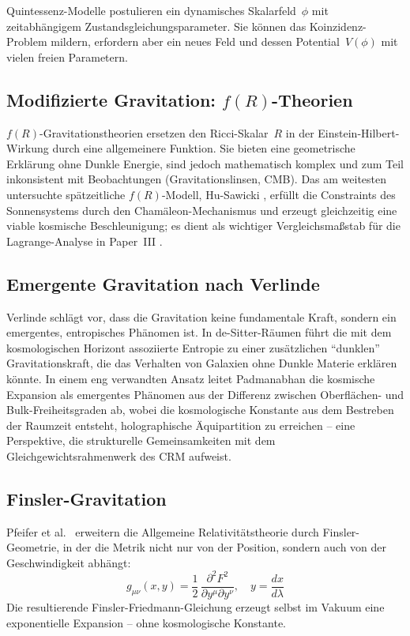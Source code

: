 \documentclass[aps,prd,twocolumn,superscriptaddress,nofootinbib]{revtex4-2}
\begin{document}
Quintessenz-Modelle \cite{Caldwell1998} postulieren ein dynamisches Skalarfeld~$\phi$ mit zeitabh\"angigem Zustandsgleichungsparameter. Sie k\"onnen das Koinzidenz-Problem mildern, erfordern aber ein neues Feld und dessen Potential~$V(\phi)$ mit vielen freien Parametern.

\subsection{Modifizierte Gravitation: $f(R)$-Theorien}

$f(R)$-Gravitationstheorien \cite{Starobinsky1980, Sotiriou2010} ersetzen den Ricci-Skalar~$R$ in der Einstein-Hilbert-Wirkung durch eine allgemeinere Funktion. Sie bieten eine geometrische Erkl\"arung ohne Dunkle Energie, sind jedoch mathematisch komplex und zum Teil inkonsistent mit Beobachtungen (Gravitationslinsen, CMB). Das am weitesten untersuchte sp\"atzeitliche $f(R)$-Modell, Hu-Sawicki \cite{HuSawicki2007}, erf\"ullt die Constraints des Sonnensystems durch den Cham\"aleon-Mechanismus und erzeugt gleichzeitig eine viable kosmische Beschleunigung; es dient als wichtiger Vergleichsma\ss{}stab f\"ur die Lagrange-Analyse in Paper~III \cite{Geiger2026c}.

\subsection{Emergente Gravitation nach Verlinde}

Verlinde \cite{Verlinde2011, Verlinde2017} schl\"agt vor, dass die Gravitation keine fundamentale Kraft, sondern ein emergentes, entropisches Ph\"anomen ist. In de-Sitter-R\"aumen f\"uhrt die mit dem kosmologischen Horizont assoziierte Entropie zu einer zus\"atzlichen ``dunklen'' Gravitationskraft, die das Verhalten von Galaxien ohne Dunkle Materie erkl\"aren k\"onnte. In einem eng verwandten Ansatz leitet Padmanabhan \cite{Padmanabhan2012} die kosmische Expansion als emergentes Ph\"anomen aus der Differenz zwischen Oberfl\"achen- und Bulk-Freiheitsgraden ab, wobei die kosmologische Konstante aus dem Bestreben der Raumzeit entsteht, holographische \"Aquipartition zu erreichen -- eine Perspektive, die strukturelle Gemeinsamkeiten mit dem Gleichgewichtsrahmenwerk des CRM aufweist.

\subsection{Finsler-Gravitation}

Pfeifer et al.\ \cite{Pfeifer2025} erweitern die Allgemeine Relativit\"atstheorie durch Finsler-Geometrie, in der die Metrik nicht nur von der Position, sondern auch von der Geschwindigkeit abh\"angt:
\begin{equation}
g_{\mu\nu}(x, y) = \frac{1}{2}\,\frac{\partial^2 F^2}{\partial y^\mu \partial y^\nu}, \quad y = \frac{dx}{d\lambda}
\end{equation}
Die resultierende Finsler-Friedmann-Gleichung erzeugt selbst im Vakuum eine exponentielle Expansion -- ohne kosmologische Konstante.
\end{document}
